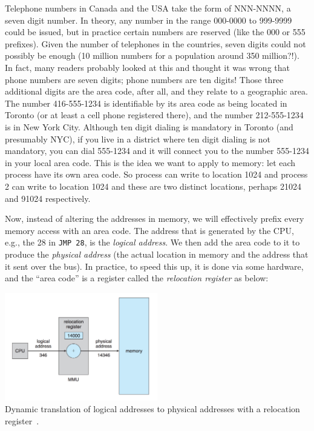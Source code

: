 Telephone numbers in Canada and the USA take the form of NNN-NNNN, a seven digit number. In theory, any number in the range 000-0000 to 999-9999 could be issued, but in practice certain numbers are reserved (like the 000 or 555 prefixes). Given the number of telephones in the countries, seven digits could not possibly be enough (10 million numbers for a population around 350 million?!). In fact, many readers probably looked at this and thought it was wrong that phone numbers are seven digits; phone numbers are ten digits! Those three additional digits are the area code, after all, and they relate to a geographic area. The number 416-555-1234 is identifiable by its area code as being located in Toronto (or at least a cell phone registered there), and the number 212-555-1234 is in New York City. Although ten digit dialing is mandatory in Toronto (and presumably NYC), if you live in a district where ten digit dialing is not mandatory, you can dial 555-1234 and it will connect you to the number 555-1234 in your local area code. This is the idea we want to apply to memory: let each process have its own area code. So process can write to location 1024 and process 2 can write to location 1024 and these are two distinct locations, perhaps 21024 and 91024 respectively.

Now, instead of altering the addresses in memory, we will effectively prefix every memory access with an area code. The address that is generated by the CPU, e.g., the 28 in \texttt{JMP 28}, is the \textit{logical address}. We then add the area code to it to produce the \textit{physical address} (the actual location in memory and the address that it sent over the bus). In practice, to speed this up, it is done via some hardware, and the ``area code'' is a register called the \textit{relocation register} as below:

\begin{center}
\includegraphics[width=0.5\textwidth]{images/relocation-register.png}\\
Dynamic translation of logical addresses to physical addresses with a relocation register~\cite{osc}.
\end{center}

